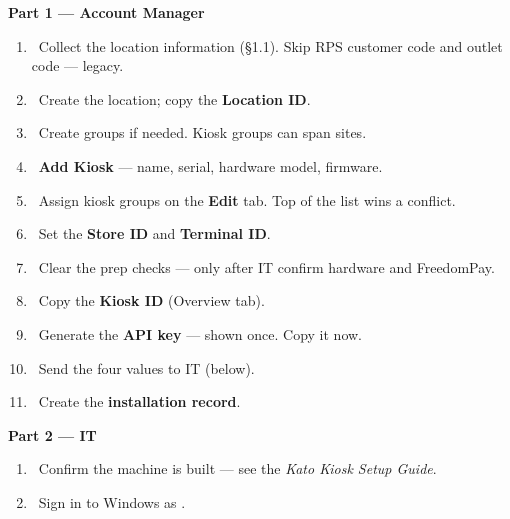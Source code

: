 \documentclass[a4paper,10pt]{article}
\begin{document}
\begin{center}
\begin{minipage}[t]{0.475\textwidth}
\colorbox{weknowsky}{\parbox{\dimexpr\textwidth-2\fboxsep}{%
  \vspace{2pt}\centering\bfseries\color{weknownight}
  Part 1 --- Account Manager\vspace{2pt}}}
\vspace{4pt}
\footnotesize
\begin{enumerate}[leftmargin=6mm,itemsep=3pt]
  \item \emptybox\ Collect the location information (\S1.1). Skip RPS
        customer code and outlet code --- legacy.
  \item \emptybox\ Create the location; copy the \textbf{Location ID}.
  \item \emptybox\ Create groups if needed. Kiosk groups can span sites.
  \item \emptybox\ \textbf{Add Kiosk} --- name, serial, hardware model,
        firmware.
  \item \emptybox\ Assign kiosk groups on the \textbf{Edit} tab.
        Top of the list wins a conflict.
  \item \emptybox\ Set the \textbf{Store ID} and \textbf{Terminal ID}.
  \item \emptybox\ Clear the prep checks --- only after IT confirm
        hardware and FreedomPay.
  \item \emptybox\ Copy the \textbf{Kiosk ID} (Overview tab).
  \item \emptybox\ Generate the \textbf{API key} --- shown once. Copy it
        now.
  \item \emptybox\ Send the four values to IT (below).
  \item \emptybox\ Create the \textbf{installation record}.
\end{enumerate}
\end{minipage}\hfill
\begin{minipage}[t]{0.475\textwidth}
\colorbox{weknowgreyL}{\parbox{\dimexpr\textwidth-2\fboxsep}{%
  \vspace{2pt}\centering\bfseries\color{weknownight}
  Part 2 --- IT\vspace{2pt}}}
\vspace{4pt}
\footnotesize
\begin{enumerate}[leftmargin=6mm,itemsep=3pt]
  \item \emptybox\ Confirm the machine is built --- see the
        \emph{Kato Kiosk Setup Guide}.
  \item \emptybox\ Sign in to Windows as .

\end{enumerate}
\end{minipage}
\end{center}
\end{document}
